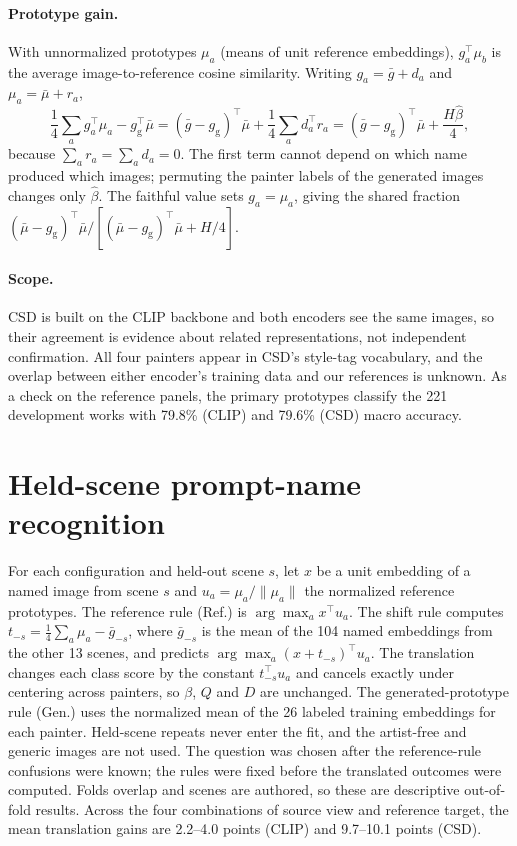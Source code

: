 \paragraph{Prototype gain.} With unnormalized prototypes $\mu_a$ (means of unit reference
embeddings), $g_a^\top\mu_b$ is the average image-to-reference cosine similarity. Writing
$g_a=\bar g+d_a$ and $\mu_a=\bar\mu+r_a$,
\begin{equation}
\frac14\sum_a g_a^\top\mu_a-g_{\mathrm g}^\top\bar\mu
=(\bar g-g_{\mathrm g})^\top\bar\mu+\frac14\sum_a d_a^\top r_a
=(\bar g-g_{\mathrm g})^\top\bar\mu+\frac{H\widehat\beta}{4},
\end{equation}
because $\sum_a r_a=\sum_a d_a=0$. The first term cannot depend on which name produced which
images; permuting the painter labels of the generated images changes only $\widehat\beta$. The
faithful value sets $g_a=\mu_a$, giving the shared fraction $(\bar\mu-g_{\mathrm
g})^\top\bar\mu/[(\bar\mu-g_{\mathrm g})^\top\bar\mu+H/4]$.

\paragraph{Scope.} CSD is built on the CLIP backbone and both encoders see the same images, so
their agreement is evidence about related representations, not independent confirmation. All
four painters appear in CSD's style-tag vocabulary, and the overlap between either encoder's
training data and our references is unknown. As a check on the reference panels, the primary
prototypes classify the 221 development works with 79.8\% (CLIP) and 79.6\% (CSD) macro
accuracy.

\FloatBarrier
\section{Held-scene prompt-name recognition}\label{app:transfer}



For each configuration and held-out scene $s$, let $x$ be a unit embedding of a named image
from scene $s$ and $u_a=\mu_a/\|\mu_a\|$ the normalized reference prototypes. The reference rule
(Ref.) is $\arg\max_a x^\top u_a$. The shift rule computes $t_{-s}=\frac14\sum_a\mu_a-\bar
g_{-s}$, where $\bar g_{-s}$ is the mean of the 104 named embeddings from the other 13 scenes,
and predicts $\arg\max_a(x+t_{-s})^\top u_a$. The translation changes each class score by the
constant $t_{-s}^\top u_a$ and cancels exactly under centering across painters, so $\beta$, $Q$
and $D$ are unchanged. The generated-prototype rule (Gen.) uses the normalized mean of the 26
labeled training embeddings for each painter. Held-scene repeats never enter the fit, and the
artist-free and generic images are not used. The question was chosen after the reference-rule
confusions were known; the rules were fixed before the translated outcomes were computed. Folds
overlap and scenes are authored, so these are descriptive out-of-fold results. Across the four
combinations of source view and reference target, the mean translation gains are 2.2--4.0
points (CLIP) and 9.7--10.1 points (CSD).


